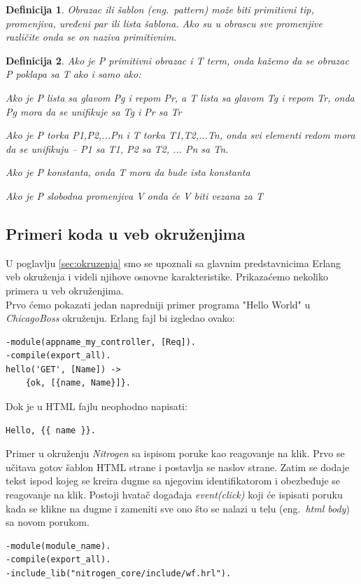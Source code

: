 \documentclass[a4paper]{article}
\newtheorem{definition}{Definicija}
\begin{document}
{\begin{definition}{Obrazac ili šablon (eng.~{\em pattern})}
može biti primitivni tip, promenjiva, uređeni par ili lista šablona.
Ako su u obrascu sve promenjive različite onda se on naziva primitivnim.
\end{definition}

\begin{definition}{}
Ako je P  primitivni obrazac i T term, onda kažemo da se obrazac P poklapa sa T ako i samo ako:
\begin{list}{•}{}
\item Ako je P lista sa glavom Pg i repom Pr, a T lista sa glavom Tg i repom Tr, onda Pg mora da se unifikuje sa Tg i Pr sa Tr
\item Ako je P torka {P1,P2,...Pn} i T torka {T1,T2,...Tn}, onda svi elementi redom mora da se unifikuju – P1 sa T1, P2 sa T2, ... Pn sa Tn.
\item Ako je P konstanta, onda T mora da bude ista konstanta
\item Ako je P slobodna promenjiva V onda će V biti vezana za T
\end{list}
\end{definition}



\subsection{Primeri koda u veb okruženjima}
\label{sec:dodatak_primeri_okruzenja}

U poglavlju \ref{sec:okruzenja} smo se upoznali sa glavnim predstavnicima Erlang veb okruženja i videli njihove osnovne karakteristike. Prikazaćemo nekoliko primera u veb okruženjima. \\ 

Prvo ćemo pokazati jedan napredniji primer programa "Hello World" u {\em ChicagoBoss} okruženju. Erlang fajl bi izgledao ovako:
\begin{verbatim}
-module(appname_my_controller, [Req]).
-compile(export_all).
hello('GET', [Name]) ->
	{ok, [{name, Name}]}.
\end{verbatim}

Dok je u HTML fajlu neophodno napisati:
\begin{verbatim}
Hello, {{ name }}.
\end{verbatim} 

Primer u okruženju {\em Nitrogen} sa ispisom poruke kao reagovanje na klik. Prvo se učitava gotov šablon HTML strane i postavlja se naslov strane. Zatim se dodaje tekst ispod kojeg se kreira dugme sa njegovim identifikatorom i obezbeđuje se reagovanje na klik. Postoji hvatač događaja {\em event(click)} koji će ispisati poruku kada se klikne na dugme i zameniti sve ono što se nalazi u telu (eng.~{\em html body}) sa novom porukom.
\begin{verbatim}
-module(module_name).
-compile(export_all).
-include_lib("nitrogen_core/include/wf.hrl").


\end{verbatim}}
\end{document}
